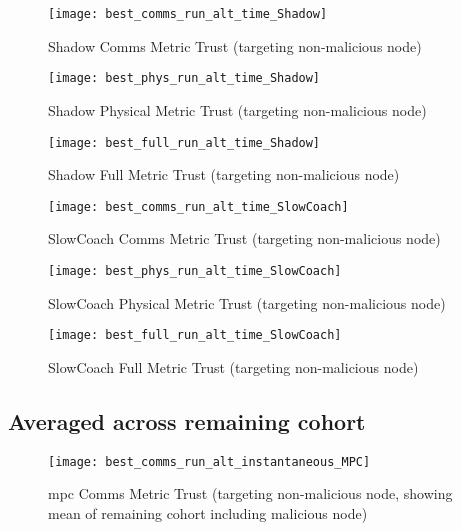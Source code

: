 \begin{figure}[h]
  \centering
  \texttt{[image: best\_comms\_run\_alt\_time\_Shadow]}
  \caption{Shadow Comms Metric Trust (targeting non-malicious node)}
  \label{fig:comms_alt_time_shadow}
\end{figure}

\begin{figure}[h]
  \centering
  \texttt{[image: best\_phys\_run\_alt\_time\_Shadow]}
  \caption{Shadow Physical Metric Trust (targeting non-malicious node)}
  \label{fig:phys_alt_time_shadow}
\end{figure}

\begin{figure}[h]
  \centering
  \texttt{[image: best\_full\_run\_alt\_time\_Shadow]}
  \caption{Shadow Full Metric Trust (targeting non-malicious node)}
  \label{fig:full_alt_time_shadow}
\end{figure}



\begin{figure}[h]
  \centering
  \texttt{[image: best\_comms\_run\_alt\_time\_SlowCoach]}
  \caption{SlowCoach Comms Metric Trust (targeting non-malicious node)}
  \label{fig:comms_alt_time_slowcoach}
\end{figure}

\begin{figure}[h]
  \centering
  \texttt{[image: best\_phys\_run\_alt\_time\_SlowCoach]}
  \caption{SlowCoach Physical Metric Trust (targeting non-malicious node)}
  \label{fig:phys_alt_time_slowcoach}
\end{figure}

\begin{figure}[h]
  \centering
  \texttt{[image: best\_full\_run\_alt\_time\_SlowCoach]}
  \caption{SlowCoach Full Metric Trust (targeting non-malicious node)}
  \label{fig:full_alt_time_slowcoach}
\end{figure}

\clearpage

\subsection{Averaged across remaining cohort}\label{sec:apx_mean_targeting_non_malicious}

\begin{figure}[h]
  \centering
  \texttt{[image: best\_comms\_run\_alt\_instantaneous\_MPC]}
  \caption{\gls{mpc} Comms Metric Trust (targeting non-malicious node, showing mean of remaining cohort including malicious node)}
  \label{fig:comms_alt_instantaneous_mpc}
\end{figure}

